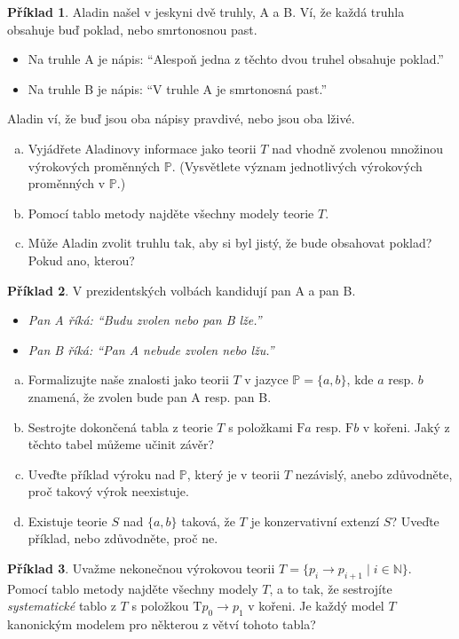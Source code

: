 \documentclass[a4paper]{article}
\theoremstyle{definition}
\newtheorem{problem}{Příklad}
\begin{document}
\medskip\begin{problem}
Aladin našel v jeskyni dvě truhly, A a B. Ví, že každá truhla obsahuje buď poklad, nebo smrtonosnou past.
\begin{itemize}
\item Na truhle A je nápis: ``Alespoň jedna z těchto dvou truhel obsahuje poklad.''
\item Na truhle B je nápis: ``V truhle A je smrtonosná past.''
\end{itemize}
Aladin ví, že buď jsou oba nápisy pravdivé, nebo jsou oba lživé.
\begin{enumerate}[(a)]
    \item Vyjádřete Aladinovy informace jako teorii $T$ nad vhodně zvolenou množinou výrokových proměnných $\mathbb P$. (Vysvětlete význam jednotlivých výrokových proměnných v $\mathbb P$.)
    \item Pomocí tablo metody najděte všechny modely teorie $T$.
    \item Může Aladin zvolit truhlu tak, aby si byl jistý, že bude obsahovat poklad? Pokud ano, kterou?
\end{enumerate}
\end{problem}


\medskip\begin{problem}
V prezidentských volbách kandidují pan A a pan B.
\begin{itemize}
\item \emph{Pan A říká: ``Budu zvolen nebo pan B lže.''}
\item \emph{Pan B říká: ``Pan A nebude zvolen nebo lžu.''}
\end{itemize}
\begin{enumerate}[(a)]
\item Formalizujte naše znalosti jako teorii $T$ v jazyce $\mathbb P=\{a,b\}$, kde $a$ resp. $b$ znamená, že zvolen bude pan A resp. pan B.
\item Sestrojte dokončená tabla z teorie $T$ s položkami $\mathrm{F}a$ resp. $\mathrm{F}b$ v kořeni. Jaký z těchto tabel můžeme učinit závěr?
\item Uveďte příklad výroku nad $\mathbb{P}$, který je v teorii $T$ nezávislý, anebo zdůvodněte, proč takový výrok neexistuje.
\item Existuje teorie $S$ nad $\{a,b\}$ taková, že $T$ je konzervativní extenzí $S$? Uveďte příklad, nebo zdůvodněte, proč ne.
\end{enumerate}
\end{problem}


\medskip\begin{problem}
    Uvažme nekonečnou výrokovou teorii $T=\{p_i \to p_{i+1}\mid i\in \mathbb{N}\}$. Pomocí tablo metody najděte všechny modely $T$, a to tak, že sestrojíte \emph{systematické} tablo z $T$ s položkou $\mathrm{T}p_0\to p_1$ v kořeni. Je každý model $T$ kanonickým modelem pro některou z větví tohoto tabla?
\end{problem}
\end{document}
